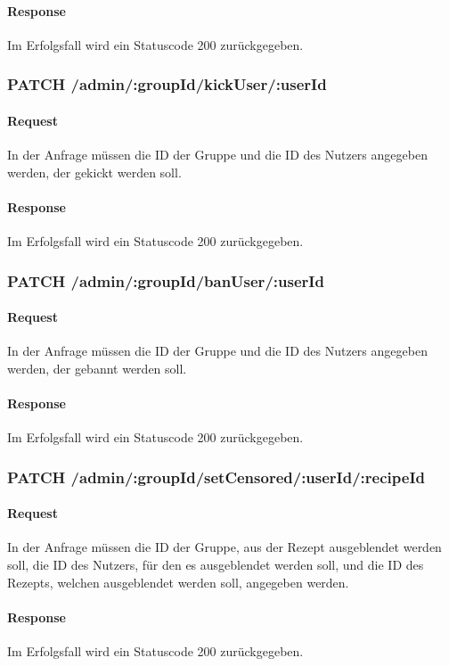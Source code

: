 \documentclass{entwurfsheft}
\begin{document}
\paragraph{Response}
Im Erfolgsfall wird ein Statuscode 200 zurückgegeben.

\subsubsection*{PATCH /admin/:groupId/kickUser/:userId}
\paragraph{Request}
In der Anfrage müssen die ID der Gruppe und die ID des Nutzers angegeben werden, der gekickt werden soll.
\paragraph{Response}
Im Erfolgsfall wird ein Statuscode 200 zurückgegeben.

\subsubsection*{PATCH /admin/:groupId/banUser/:userId}
\paragraph{Request}
In der Anfrage müssen die ID der Gruppe und die ID des Nutzers angegeben werden, der gebannt werden soll.
\paragraph{Response}
Im Erfolgsfall wird ein Statuscode 200 zurückgegeben.

\subsubsection*{PATCH /admin/:groupId/setCensored/:userId/:recipeId}
    \paragraph{Request}
        In der Anfrage müssen die ID der Gruppe, aus der Rezept ausgeblendet werden soll, die ID des Nutzers, für den es ausgeblendet werden soll, und die ID des Rezepts, welchen ausgeblendet werden soll, angegeben werden.
    \paragraph{Response}
        Im Erfolgsfall wird ein Statuscode 200 zurückgegeben.
\end{document}
